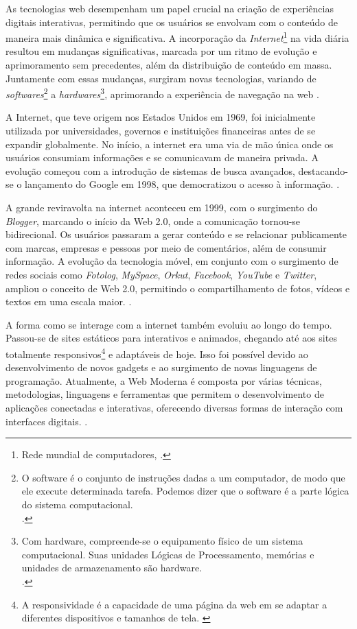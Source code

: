 As tecnologias
\acrshort{web}
desempenham um papel crucial na criação de experiências
digitais interativas, permitindo que os usuários se envolvam com o conteúdo de maneira mais
dinâmica e significativa. A incorporação da
\textit{Internet}\footnote{Rede mundial de computadores, \cite{marco-civil-art-2}.
}
na vida diária resultou em mudanças
significativas, marcada por um ritmo de evolução e aprimoramento sem precedentes, além da
distribuição de conteúdo em massa. Juntamente com essas mudanças, surgiram novas
tecnologias, variando de
\textit{softwares}\footnote{O software é o conjunto de instruções dadas a um computador, de modo que
    ele execute determinada tarefa. Podemos dizer que o software é
    a parte lógica do sistema computacional.  \\   \cite{hardware-e-software}.
}
a
\textit{hardwares}\footnote{Com hardware, compreende-se o equipamento físico de um sistema computacional.
    Suas unidades Lógicas de Processamento, memórias e unidades de armazenamento são
    hardware. \\ \cite{hardware-e-software}.
},
aprimorando a experiência de navegação na
\acrshort{web}
\cite{molgado}.

A Internet, que teve origem nos Estados Unidos em 1969, foi inicialmente utilizada
por universidades, governos e instituições financeiras antes de se expandir globalmente. No
início, a internet era uma via de mão única onde os usuários consumiam informações e se
comunicavam de maneira privada. A evolução começou com a introdução de sistemas de
busca avançados, destacando-se o lançamento do Google em 1998, que democratizou o
acesso à informação.
\cite{vitoriano}.

A grande reviravolta na internet aconteceu em 1999, com o surgimento do
\textit{Blogger},
marcando o início da
Web
2.0, onde a comunicação tornou-se bidirecional. Os usuários
passaram a gerar conteúdo e se relacionar publicamente com marcas, empresas e pessoas por
meio de comentários, além de consumir informação. A evolução da tecnologia móvel, em
conjunto com o surgimento de redes sociais como
\textit{Fotolog},
\textit{MySpace},
\textit{Orkut},
\textit{Facebook},
\textit{YouTube}
e
\textit{Twitter},
ampliou o conceito de Web 2.0, permitindo o compartilhamento de fotos,
vídeos e textos em uma escala maior.
\cite{vitoriano}.

A forma como se interage com a internet também evoluiu ao longo do tempo.
Passou-se de sites estáticos para interativos e animados, chegando até aos sites totalmente
responsivos\footnote{A responsividade é a capacidade de uma página da
    \acrshort{web}
    em se adaptar a diferentes dispositivos e tamanhos de tela.
    \cite{responsivo}
}
e adaptáveis de hoje. Isso foi possível devido ao desenvolvimento de novos
gadgets e ao surgimento de novas linguagens de programação. Atualmente, a Web Moderna é
composta por várias técnicas, metodologias, linguagens e ferramentas que permitem o
desenvolvimento de aplicações conectadas e interativas, oferecendo diversas formas de
interação com interfaces digitais.
\cite{vitoriano}.


